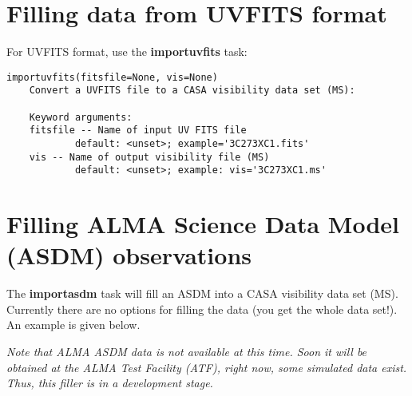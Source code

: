 \section{Filling data from UVFITS format}
\label{section:vla.uvfits.fill}

For UVFITS format, use the {\bf importuvfits} task: 

\small
\begin{verbatim}
importuvfits(fitsfile=None, vis=None)
    Convert a UVFITS file to a CASA visibility data set (MS):
    
    Keyword arguments:
    fitsfile -- Name of input UV FITS file
            default: <unset>; example='3C273XC1.fits'
    vis -- Name of output visibility file (MS)
            default: <unset>; example: vis='3C273XC1.ms'
\end{verbatim}
\normalsize

\section{Filling ALMA Science Data Model (ASDM) observations}
\label{section:alma.fill}

The {\bf importasdm} task will fill an ASDM into a CASA visibility
data set (MS). Currently there are no options for filling the data
(you get the whole data set!).  An example is given below.  

{\it Note that ALMA ASDM data is not available at this time.  Soon it
will be obtained at the ALMA Test Facility (ATF), right now, some
simulated data exist.  Thus, this filler is in a development stage.  }

